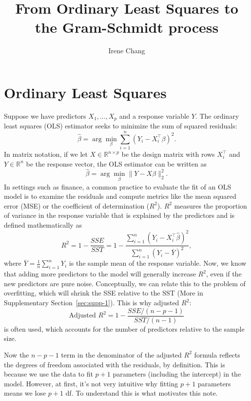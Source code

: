 \documentclass{article}
\title{From Ordinary Least Squares to the Gram-Schmidt process}
\author{Irene Chang}
\newcommand{\R}{\mathbb{R}}
\begin{document}
\maketitle

\section{Ordinary Least Squares}
Suppose we have predictors $X_1, \ldots, X_p$ and a response variable $Y$. The ordinary least squares (OLS) estimator seeks to minimize the sum of squared residuals:
\[
  \hat{\beta} = \arg\min_\beta \sum_{i=1}^n (Y_i - X_i^\top \beta)^2.
\]
In matrix notation, if we let $X \in \R^{n \times p}$ be the design matrix with rows $X_i^\top$ and $Y \in \R^n$ be the response vector, the OLS estimator can be written as
\begin{equation}
  \hat{\beta} = \arg\min_\beta \|Y - X\beta\|_2^2. \label{eq:sse-ols}
\end{equation}
In settings such as finance, a common practice to evaluate the fit of an OLS model is to examine the residuals and compute metrics like the mean squared error (MSE) or the coefficient of determination ($R^2$). $R^2$ measures the proportion of variance in the response variable that is explained by the predictors and is defined mathematically as 
\[
  R^2 = 1 - \frac{SSE}{SST} =  1 - \frac{\sum_{i=1}^n (Y_i - X_i^\top \hat{\beta})^2}{\sum_{i=1}^n (Y_i - \bar{Y})^2},
\]
where $\bar{Y} = \frac{1}{n} \sum_{i=1}^n Y_i$ is the sample mean of the response variable. Now, we know that adding more predictors to the model will generally increase $R^2$, even if the new predictors are pure noise. Conceptually, we can relate this to the problem of overfitting, which will shrink the SSE relative to the SST (More in Supplementary Section~\ref{sec:supp-1}). This is why adjusted $R^2$: 
\[
\text{Adjusted } R^2 = 1 - \frac{SSE/(n-p-1)}{SST/(n-1)}
\]
is often used, which accounts for the number of predictors relative to the sample size.

Now the $n - p - 1$ term in the denominator of the adjusted $R^2$ formula reflects the degrees of freedom associated with the residuals, by definition. This is because we use the data to fit $p + 1$ parameters (including the intercept) in the model. However, at first, it's not very intuitive why fitting $p+1$ parameters means we lose $p+1$ df. To understand this is what motivates this note. 
\end{document}
